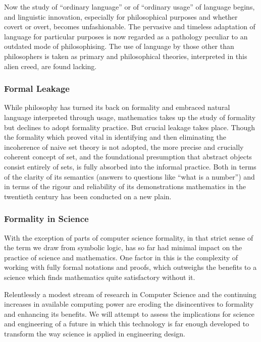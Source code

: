 Now the study of ``ordinary language'' or of ``ordinary usage'' of language begins, and linguistic innovation, especially for philosophical purposes and whether covert or overt, becomes unfashionable.
The pervasive and timeless adaptation of language for particular purposes is now regarded as a pathology peculiar to an outdated mode of philosophising.
The use of language by those other than philosophers is taken as primary and philosophical theories, interpreted in this alien creed, are found lacking.

\subsubsection{Formal Leakage}

While philosophy has turned its back on formality and embraced natural language interpreted through usage, mathematics takes up the study of formality but declines to adopt formality practice.
But crucial leakage takes place.
Though the formality which proved vital in identifying and then eliminating the incoherence of naive set theory is not adopted, the more precise and crucially coherent concept of set, and the foundational presumption that abstract objects consist entirely of sets, is fully absorbed into the informal practice.
Both in terms of the clarity of its semantics (answers to questions like ``what is a number'') and in terms of the rigour and reliability of its demonstrations mathematics in the twentieth century has been conducted on a new plain.

\subsubsection{Formality in Science}

With the exception of parts of computer science formality, in that strict sense of the term we draw from symbolic logic, has so far had minimal impact on the practice of science and mathematics.
One factor in this is the complexity of working with fully formal notations and proofs, which outweighs the benefits to a science which finds mathematics quite satisfactory without it.

Relentlessly a modest stream of research in Computer Science and the continuing increases in available computing power are eroding the disincentives to formality and enhancing its benefits.
We will attempt to assess the implications for science and engineering of a future in which this technology is far enough developed to transform the way science is applied in engineering design.

